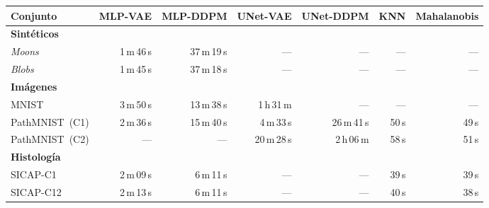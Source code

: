 \begin{tabular}{lrrrrrr}
    \toprule
    Conjunto & MLP-VAE & MLP-DDPM & UNet-VAE & UNet-DDPM & KNN & Mahalanobis \\
    \midrule
    \multicolumn{7}{l}{\textbf{Sintéticos}} \\
    \quad \textit{Moons} & 1\,m\,46\,s & 37\,m\,19\,s & --- & --- & --- & --- \\
    \quad \textit{Blobs} & 1\,m\,45\,s & 37\,m\,18\,s & --- & --- & --- & --- \\
    \midrule
    \multicolumn{7}{l}{\textbf{Imágenes}} \\
    \quad MNIST & 3\,m\,50\,s & 13\,m\,38\,s & 1\,h\,31\,m & --- & --- & --- \\
    \quad PathMNIST~(C1) & 2\,m\,36\,s & 15\,m\,40\,s & 4\,m\,33\,s & 26\,m\,41\,s & 50\,s & 49\,s \\
    \quad PathMNIST~(C2) & --- & --- & 20\,m\,28\,s & 2\,h\,06\,m & 58\,s & 51\,s \\
    \midrule
    \multicolumn{7}{l}{\textbf{Histología}} \\
    \quad SICAP-C1 & 2\,m\,09\,s & 6\,m\,11\,s & --- & --- & 39\,s & 39\,s \\
    \quad SICAP-C12 & 2\,m\,13\,s & 6\,m\,11\,s & --- & --- & 40\,s & 38\,s \\
    \bottomrule
\end{tabular}
